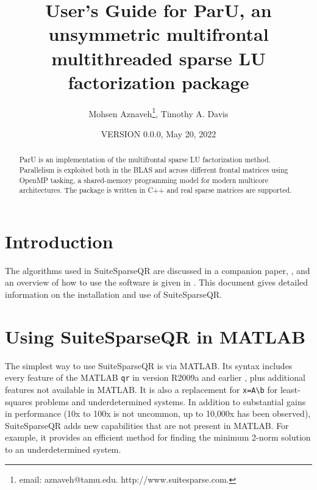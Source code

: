 \documentclass[12pt]{article}
\title{User's Guide for ParU, an unsymmetric multifrontal multithreaded sparse
LU factorization package}
\author{Mohsen Aznaveh\thanks{
email: aznaveh@tamu.edu.
http://www.suitesparse.com.
},
Timothy A. Davis}
\date{VERSION 0.0.0, May 20, 2022}
\begin{document}
\maketitle

\begin{abstract}

ParU is an implementation of the multifrontal sparse LU factorization
method.  Parallelism is exploited both in the BLAS and across different frontal
matrices using OpenMP tasking, a shared-memory programming model for modern 
multicore architectures. The package is written in C++ and real sparse matrices 
are supported.

\end{abstract}

\maketitle

\section{Introduction}
\label{intro}

The algorithms used in SuiteSparseQR are discussed in a companion paper,
\cite{Davis08a}, and an overview of how to use the software is given in
\cite{Davis08b}.  This document gives detailed information on the installation
and use of SuiteSparseQR.

\section{Using SuiteSparseQR in MATLAB}

The simplest way to use SuiteSparseQR is via MATLAB.  Its syntax includes every
feature of the MATLAB \verb'qr' in version R2009a and earlier
\cite{GilbertMolerSchreiber}, plus additional features not available in MATLAB.
It is also a replacement for \verb'x=A\b' for least-squares problems and
underdetermined systems.  In addition to substantial gains in performance (10x
to 100x is not uncommon, up to 10,000x has been observed), SuiteSparseQR adds
new capabilities that are not present in MATLAB.  For example, it provides an
efficient method for finding the minimum 2-norm solution to an underdetermined
system.
\end{document}
